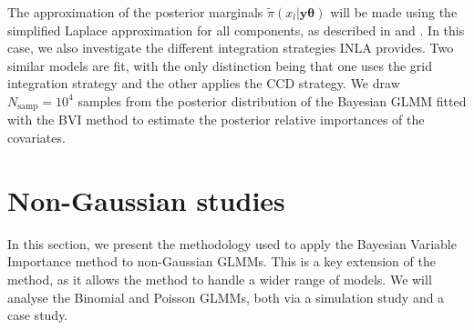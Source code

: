 The approximation of the posterior marginals $\tilde{\pi}(x_l \lvert \mathbf{y} \boldsymbol{\theta})$ will be made using the simplified Laplace approximation for all components, as described in  and . In this case, we also investigate the different integration strategies INLA provides. Two similar models are fit, with the only distinction being that one uses the grid integration strategy and the other applies the CCD strategy. We draw $N_{\text{samp}}=10^4$ samples from the posterior distribution of the Bayesian GLMM fitted with the BVI method to estimate the posterior relative importances of the covariates.

\section{Non-Gaussian studies}
In this section, we present the methodology used to apply the Bayesian Variable Importance method to non-Gaussian GLMMs. This is a key extension of the method, as it allows the method to handle a wider range of models. We will analyse the Binomial and Poisson GLMMs, both via a simulation study and a case study.

